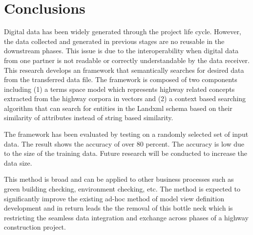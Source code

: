 \documentclass[NewProceedings, InsideFigs]{ascelike} %
\begin{document}
\section{Conclusions} \label{sec:conclns} 
Digital data has been widely generated through the project life cycle. However, the data collected and generated in previous stages are no reusable in the downstream phases. This issue is due to the interoperability when digital data from one partner is not readable or correctly understandable by the data receiver. This research develops an framework that semantically searches for desired data from the transferred data file. The framework is composed of two components including (1) a terms space model which represents highway related concepts extracted from the highway corpora in vectors and (2) a context based searching algorithm that can search for entities in the Landxml schema based on their similarity of attributes instead of string based similarity. 
\par
The framework has been evaluated by testing on a randomly selected set of input data. The result shows the accuracy of over 80 percent. The accuracy is low due to the size of the training data. Future research will be conducted to increase the data size. 
\par
This method is broad and can be applied to other business processes such as green building checking, environment checking, etc. The method is expected to significantly improve the existing ad-hoc method of model view definition development and in return leads the the removal of this bottle neck which is restricting the seamless data integration and exchange across phases of a highway construction project. 


%
%
\end{document}
